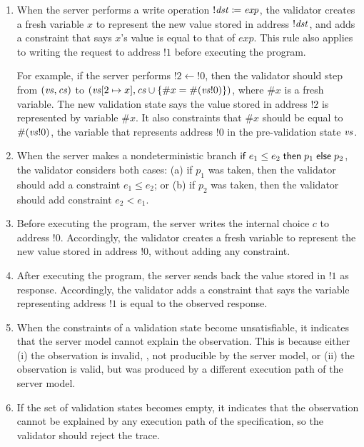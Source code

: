 \begin{enumerate}
\item \label{rule:write} When the server performs a write operation
  $!\mathit{dst}\coloneqq \mathit{exp}$, the validator creates a fresh variable $x$ to
  represent the new value stored in address $!\mathit{dst}$, and adds a constraint that
  says $x$'s value is equal to that of $\mathit{exp}$.  This rule also applies
  to writing the request to address $!1$ before executing the program.

  For example, if the server performs $!2\gets!0$, then the validator should
  step from $(\mathit{vs},\mathit{cs})$ to $(\mathit{vs}[2\mapsto x],\mathit{cs}\cup\{\#x=\#(\mathit{vs}!0)\})$,
  where $\#x$ is a fresh variable.  The new validation state says the value
  stored in address $!2$ is represented by variable $\#x$.  It also constraints
  that $\#x$ should be equal to $\#(\mathit{vs}!0)$, the variable that represents
  address $!0$ in the pre-validation state $\mathit{vs}$.
\item \label{rule:branch} When the server makes a nondeterministic branch $\mathsf{if}\;
  e_1\le e_2\;\mathsf{then}\; p_1\;\mathsf{else}\; p_2$, the validator considers both cases: (a) if
  $p_1$ was taken, then the validator should add a constraint $e_1\le e_2$; or
  (b) if $p_2$ was taken, then the validator should add constraint $e_2<e_1$.
\item \label{rule:choice} Before executing the program, the server writes the internal
    choice $c$ to address $!0$.  Accordingly, the validator creates a fresh
    variable to represent the new value stored in address $!0$, without adding
    any constraint.
\item \label{rule:return} After executing the program, the server sends back the
  value stored in $!1$ as response.  Accordingly, the validator adds a
  constraint that says the variable representing address $!1$ is equal to the
  observed response.
\item \label{rule:unsat} When the constraints of a validation state become
  unsatisfiable, it indicates that the server model cannot explain the
  observation.  This is because either (i) the observation is invalid, \ie,
  not producible by the server model, or (ii) the observation is valid, but was
  produced by a different execution path of the server model.

\item \label{rule:reject} If the set of validation states becomes empty, it
  indicates that the observation cannot be explained by any execution path of
  the specification, so the validator should reject the trace.
\end{enumerate}

